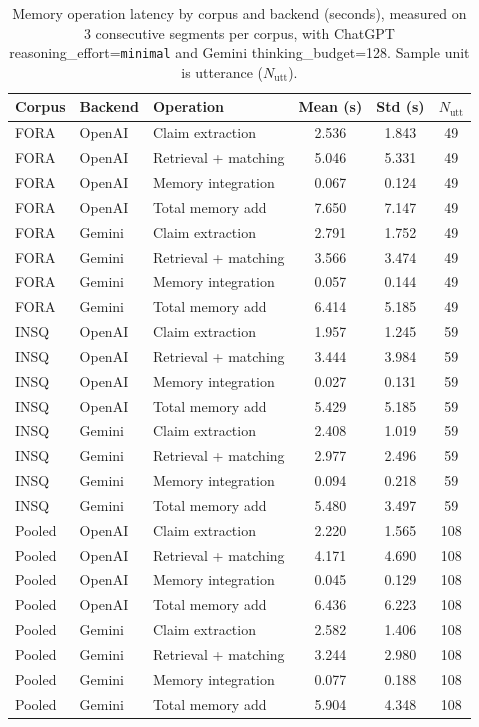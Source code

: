 \begin{table}[t]
\centering
\caption{Memory operation latency by corpus and backend (seconds), measured on 3 consecutive segments per corpus, with ChatGPT reasoning\_effort=\texttt{minimal} and Gemini thinking\_budget=128. Sample unit is utterance (\(N_{\text{utt}}\)).}
\label{tab:memory_ops_latency}
\begin{tabular}{l l l c c c}
\hline
Corpus & Backend & Operation & Mean (s) & Std (s) & \(N_{\text{utt}}\) \\
\hline
FORA & OpenAI & Claim extraction & 2.536 & 1.843 & 49 \\
FORA & OpenAI & Retrieval + matching & 5.046 & 5.331 & 49 \\
FORA & OpenAI & Memory integration & 0.067 & 0.124 & 49 \\
FORA & OpenAI & Total memory add & 7.650 & 7.147 & 49 \\
FORA & Gemini & Claim extraction & 2.791 & 1.752 & 49 \\
FORA & Gemini & Retrieval + matching & 3.566 & 3.474 & 49 \\
FORA & Gemini & Memory integration & 0.057 & 0.144 & 49 \\
FORA & Gemini & Total memory add & 6.414 & 5.185 & 49 \\
INSQ & OpenAI & Claim extraction & 1.957 & 1.245 & 59 \\
INSQ & OpenAI & Retrieval + matching & 3.444 & 3.984 & 59 \\
INSQ & OpenAI & Memory integration & 0.027 & 0.131 & 59 \\
INSQ & OpenAI & Total memory add & 5.429 & 5.185 & 59 \\
INSQ & Gemini & Claim extraction & 2.408 & 1.019 & 59 \\
INSQ & Gemini & Retrieval + matching & 2.977 & 2.496 & 59 \\
INSQ & Gemini & Memory integration & 0.094 & 0.218 & 59 \\
INSQ & Gemini & Total memory add & 5.480 & 3.497 & 59 \\
Pooled & OpenAI & Claim extraction & 2.220 & 1.565 & 108 \\
Pooled & OpenAI & Retrieval + matching & 4.171 & 4.690 & 108 \\
Pooled & OpenAI & Memory integration & 0.045 & 0.129 & 108 \\
Pooled & OpenAI & Total memory add & 6.436 & 6.223 & 108 \\
Pooled & Gemini & Claim extraction & 2.582 & 1.406 & 108 \\
Pooled & Gemini & Retrieval + matching & 3.244 & 2.980 & 108 \\
Pooled & Gemini & Memory integration & 0.077 & 0.188 & 108 \\
Pooled & Gemini & Total memory add & 5.904 & 4.348 & 108 \\
\hline
\end{tabular}
\end{table}

